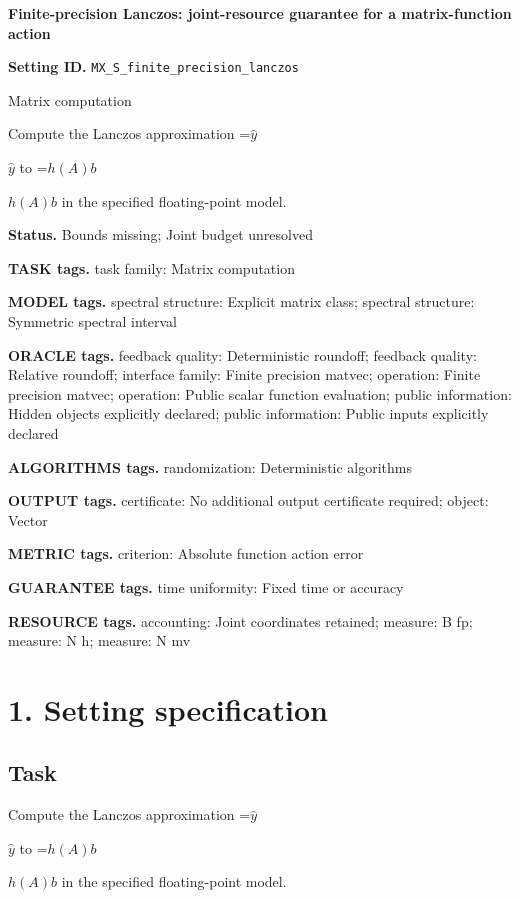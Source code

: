 \documentclass[10pt,a4paper]{article}
\newcommand{\AtlasMath}[1]{\par\begingroup\centering\setbox0=\hbox{$\displaystyle #1$}\ifdim\wd0>1.4\linewidth\typeout{ATLAS WIDE FORMULA: \the\wd0}\fi\ifdim\wd0>\linewidth\resizebox{\linewidth}{!}{\box0}\else\box0\fi\par\endgroup}
\newcommand{\AtlasInlineMath}[1]{\begingroup\setbox0=\hbox{$#1$}\ifdim\wd0>.4\linewidth\endgroup\AtlasMath{#1}\else\endgroup$#1$\fi}
\begin{document}
\raggedright

{\LARGE\bfseries\sffamily\color{AtlasNavy} Finite-precision Lanczos: joint-resource guarantee for a matrix-function action\par}\vspace{5pt}
\textbf{Setting ID.} \texttt{MX\_\allowbreak{}\allowbreak{}S\_\allowbreak{}\allowbreak{}finite\_\allowbreak{}\allowbreak{}precision\_\allowbreak{}\allowbreak{}lanczos}

Matrix computation

Compute the Lanczos approximation \AtlasInlineMath{\widehat y} to \AtlasInlineMath{h(A)b} in the specified floating-point model.

\textbf{Status.} Bounds missing; Joint budget unresolved

\textbf{TASK tags.} task family: Matrix computation

\textbf{MODEL tags.} spectral structure: Explicit matrix class; spectral structure: Symmetric spectral interval

\textbf{ORACLE tags.} feedback quality: Deterministic roundoff; feedback quality: Relative roundoff; interface family: Finite precision matvec; operation: Finite precision matvec; operation: Public scalar function evaluation; public information: Hidden objects explicitly declared; public information: Public inputs explicitly declared

\textbf{ALGORITHMS tags.} randomization: Deterministic algorithms

\textbf{OUTPUT tags.} certificate: No additional output certificate required; object: Vector

\textbf{METRIC tags.} criterion: Absolute function action error

\textbf{GUARANTEE tags.} time uniformity: Fixed time or accuracy

\textbf{RESOURCE tags.} accounting: Joint coordinates retained; measure: B fp; measure: N h; measure: N mv

\section{1. Setting specification}
\subsection{Task}
Compute the Lanczos approximation \AtlasInlineMath{\widehat y} to \AtlasInlineMath{h(A)b} in the specified floating-point model.
\end{document}
